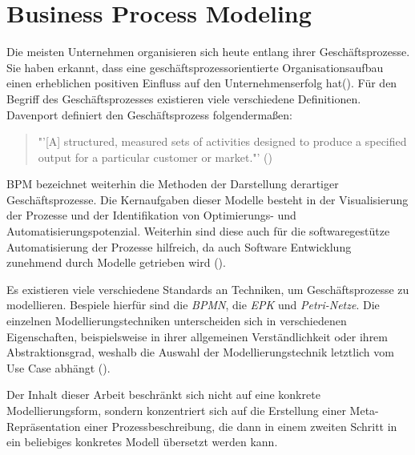 \section{Business Process Modeling}
Die meisten Unternehmen organisieren sich heute entlang ihrer Geschäftsprozesse. Sie haben erkannt, dass eine geschäftsprozessorientierte Organisationsaufbau einen erheblichen positiven Einfluss auf den Unternehmenserfolg hat(\cite[vgl.][1]{BPM2}). Für den Begriff des Geschäftsprozesses existieren viele verschiedene Definitionen. Davenport definiert den Geschäftsprozess folgendermaßen: 
\begin{quote}
"'[A] structured, measured sets of activities designed to produce a specified output for a particular customer or market."' (\cite[5]{DAVENPORT})
\end{quote} \ac{BPM} bezeichnet weiterhin die Methoden der Darstellung derartiger Geschäftsprozesse. Die Kernaufgaben dieser Modelle besteht in der Visualisierung der Prozesse und der Identifikation von Optimierungs- und Automatisierungspotenzial. Weiterhin sind diese auch für die softwaregestütze Automatisierung der Prozesse hilfreich, da auch Software Entwicklung zunehmend durch Modelle getrieben wird (\cite[vgl.][74]{BPM}).\par
Es existieren viele verschiedene Standards an Techniken, um  Geschäftsprozesse zu modellieren. Bespiele hierfür sind die \textit{\ac{BPMN}}, die \textit{\ac{EPK}} und \textit{Petri-Netze}. Die einzelnen Modellierungstechniken unterscheiden sich in verschiedenen Eigenschaften, beispielsweise in ihrer allgemeinen Verständlichkeit oder ihrem Abstraktionsgrad, weshalb die Auswahl der Modellierungstechnik letztlich vom Use Case abhängt (\cite[vgl.][75]{BPM2}).
\par
Der Inhalt dieser Arbeit beschränkt sich nicht auf eine konkrete Modellierungsform, sondern konzentriert sich auf die Erstellung einer Meta-Repräsentation einer Prozessbeschreibung, die dann in einem zweiten Schritt in ein beliebiges konkretes Modell übersetzt werden kann.